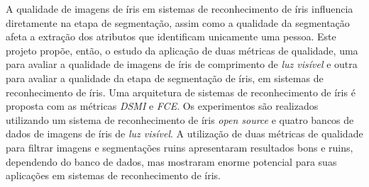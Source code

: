 A qualidade de imagens de íris em sistemas de reconhecimento de íris influencia diretamente na etapa de segmentação, assim como a qualidade da segmentação afeta a extração dos atributos que identificam unicamente uma pessoa.  Este projeto propõe, então, o estudo da aplicação de duas métricas de qualidade, uma para avaliar a qualidade de imagens de íris de comprimento de \textit{luz visível} e outra para avaliar a qualidade da etapa de segmentação de íris, em sistemas de reconhecimento de íris. Uma arquitetura de sistemas de reconhecimento de íris é proposta com as métricas \textit{\acrfull{DSMI}} e \textit{\acrfull{FCE}}. Os experimentos são realizados utilizando um sistema de reconhecimento de íris \textit{open source} e quatro bancos de dados de imagens de íris de \textit{luz visível}. A utilização de duas métricas de qualidade para filtrar imagens e segmentações ruins apresentaram resultados bons e ruins, dependendo do banco de dados, mas mostraram enorme potencial para suas aplicações em sistemas de reconhecimento de íris.
